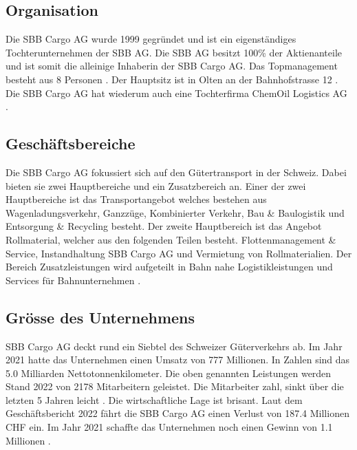 \documentclass{article}
\begin{document}
\subsection{Organisation}

Die SBB Cargo AG wurde 1999 gegründet und ist ein eigenständiges Tochterunternehmen der SBB AG.
Die SBB AG besitzt 100\% der Aktienanteile und ist somit die alleinige Inhaberin der SBB Cargo AG.
Das Topmanagement besteht aus 8 Personen \parencite[o. S.]{managmentOrganigram}.
Der Hauptsitz ist in Olten an der Bahnhofstrasse 12 \parencite[o. S.]{standorte}.
Die SBB Cargo AG hat wiederum auch eine Tochterfirma ChemOil Logistics AG \parencite[o. S.]{chemOil}.

\subsection{Geschäftsbereiche}

Die SBB Cargo AG fokussiert sich auf den Gütertransport in der Schweiz.
Dabei bieten sie zwei Hauptbereiche und ein Zusatzbereich an.
Einer der zwei Hauptbereiche ist das Transportangebot welches bestehen aus Wagenladungsverkehr, Ganzzüge, Kombinierter Verkehr, Bau \& Baulogistik und Entsorgung \& Recycling besteht.
Der zweite Hauptbereich ist das Angebot Rollmaterial, welcher aus den folgenden Teilen besteht. Flottenmanagement \& Service, Instandhaltung SBB Cargo AG und Vermietung von Rollmaterialien. 
Der Bereich Zusatzleistungen wird aufgeteilt in Bahn nahe Logistikleistungen und Services für Bahnunternehmen \parencite[o. S.]{angebot}.

\subsection{Grösse des Unternehmens}

SBB Cargo AG deckt rund ein Siebtel des Schweizer Güterverkehrs ab.
Im Jahr 2021 hatte das Unternehmen einen Umsatz von 777 Millionen.
In Zahlen sind das 5.0 Milliarden Nettotonnenkilometer.
Die oben genannten Leistungen werden Stand 2022 von 2178 Mitarbeitern geleistet.
Die Mitarbeiter zahl, sinkt über die letzten 5 Jahren leicht \parencite[o. S.]{personal}.
Die wirtschaftliche Lage ist brisant.
Laut dem Geschäftsbericht 2022 fährt die SBB Cargo AG einen Verlust von 187.4 Millionen CHF ein.
Im Jahr 2021 schaffte das Unternehmen noch einen Gewinn von 1.1 Millionen \parencite[S. 46]{geschaeftsbericht2022}.
\end{document}
